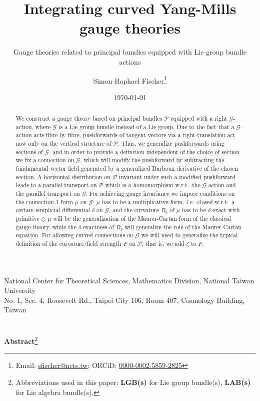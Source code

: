 \documentclass[a4paper,oneside,11pt,bibliography=totoc]{scrartcl}
\theoremstyle{plain}
\theoremstyle{remark}
\theoremstyle{definition}
\begin{document}
\renewcommand{\thefootnote}{\fnsymbol{footnote}}

\begin{titlepage}

\author{Simon-Raphael Fischer\footnote{Email: \href{mailto:sfischer@ncts.tw}{sfischer@ncts.tw}; ORCiD: \href{https://orcid.org/0000-0002-5859-2825}{0000-0002-5859-2825}} }
\title{Integrating curved Yang-Mills gauge theories} 
\subtitle{Gauge theories related to principal bundles equipped with Lie group bundle actions}
\date{\today} 
\maketitle
\thispagestyle{empty}

\begin{center}
National Center for Theoretical Sciences, Mathematics Division, National Taiwan University\\
No. 1, Sec. 4, Roosevelt Rd., Taipei City 106, Room 407, Cosmology Building, Taiwan
\ \\
\ \\
\ \\
\textbf{Abstract}\footnote[2]{Abbreviations used in this paper: \textbf{LGB(s)} for Lie group bundle(s), \textbf{LAB(s)} for Lie algebra bundle(s).}
\begin{abstract}
  \small{
	We construct a gauge theory based on principal bundles $\mathcal{P}$ equipped with a right $\mathcal{G}$-action, where $\mathcal{G}$ is a Lie group bundle instead of a Lie group. Due to the fact that a $\mathcal{G}$-action acts fibre by fibre, pushforwards of tangent vectors via a right-translation act now only on the vertical structure of $\mathcal{P}$. Thus, we generalize pushforwards using sections of $\mathcal{G}$, and in order to provide a definition independent of the choice of section we fix a connection on $\mathcal{G}$, which will modify the pushforward by subtracting the fundamental vector field generated by a generalized Darboux derivative of the chosen section. A horizontal distribution on $\mathcal{P}$ invariant under such a modified pushforward leads to a parallel transport on $\mathcal{P}$ which is a homomorphism w.r.t.\ the $\mathcal{G}$-action and the parallel transport on $\mathcal{G}$. For achieving gauge invariance we impose conditions on the connection 1-form $\mu$ on $\mathcal{G}$: $\mu$ has to be a multiplicative form, \textit{i.e.}\ closed w.r.t.\ a certain simplicial differential $\delta$ on $\mathcal{G}$, and the curvature $R_\delta$ of $\mu$ has to be $\delta$-exact with primitive $\zeta$; $\mu$ will be the generalization of the Maurer-Cartan form of the classical gauge theory, while the $\delta$-exactness of $R_\delta$ will generalize the role of the Maurer-Cartan equation. For allowing curved connections on $\mathcal{G}$ we will need to generalize the typical definition of the curvature/field strength $F$ on $\mathcal{P}$, that is, we add $\zeta$ to $F$.
	
}
\end{abstract}
\end{center}
\end{titlepage}
\end{document}
